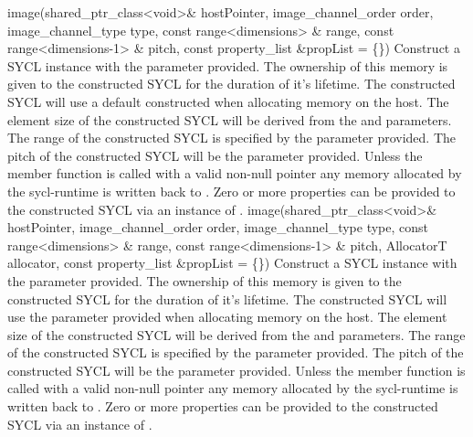   \addRowSixSL
    {image(shared_ptr_class<void>\& hostPointer, }
    { image_channel_order order, }
    { image_channel_type type, }
    { const range<dimensions> \& range, }
    { const range<dimensions-1> \& pitch, }
    { const property_list \&propList = \{\}) }
    {
         Construct a SYCL  instance with the  parameter provided. The ownership of this memory is given to the constructed SYCL  for the duration of it's lifetime.
         The constructed SYCL  will use a default constructed  when allocating memory on the host.
         The element size of the constructed SYCL  will be derived from the  and  parameters.
         The range of the constructed SYCL  is specified by the  parameter provided.
         The pitch of the constructed SYCL  will be the  parameter provided.
         Unless the member function  is called with a valid non-null pointer any memory allocated by the \gls{sycl-runtime} is written back to .
         Zero or more properties can be provided to the constructed SYCL  via an instance of .
    }
  \addRowSevenSL
    {image(shared_ptr_class<void>\& hostPointer, }
    { image_channel_order order, }
    { image_channel_type type, }
    { const range<dimensions> \& range, }
    { const range<dimensions-1> \& pitch, }
    { AllocatorT allocator, }
    { const property_list \&propList = \{\}) }
    {
         Construct a SYCL  instance with the  parameter provided. The ownership of this memory is given to the constructed SYCL  for the duration of it's lifetime.
         The constructed SYCL  will use the  parameter provided when allocating memory on the host.
         The element size of the constructed SYCL  will be derived from the  and  parameters.
         The range of the constructed SYCL  is specified by the  parameter provided.
         The pitch of the constructed SYCL  will be the  parameter provided.
         Unless the member function  is called with a valid non-null pointer any memory allocated by the \gls{sycl-runtime} is written back to .
         Zero or more properties can be provided to the constructed SYCL  via an instance of .
    }
